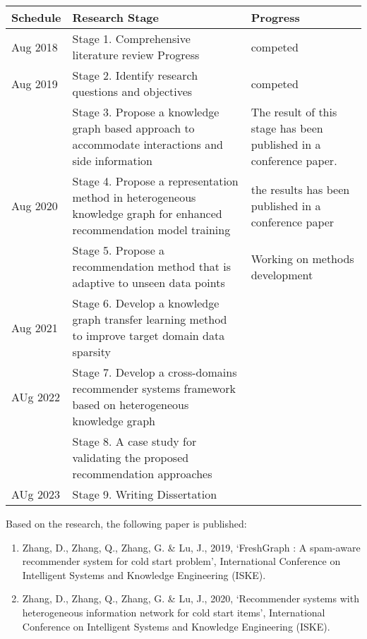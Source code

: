 \begin{table}[h!]
    \begin{tabular}{ |p{2cm}|p{6cm}|p{4cm}|}
     \hline
        Schedule & Research Stage & Progress \\
     \hline
        \rowcolor{gray}
        Aug 2018  & Stage 1. Comprehensive literature review Progress  & competed  \\
        \hline
        \rowcolor{gray}
        Aug 2019  & Stage 2. Identify research questions and objectives  & competed  \\
        \rowcolor{gray}
        & Stage 3. Propose a knowledge graph based approach to accommodate interactions and side information & The result of this stage has been published in a conference paper. \\
        \hline
        \rowcolor{lightgray}
        Aug 2020  & Stage 4. Propose a representation method in heterogeneous knowledge graph for enhanced recommendation model training & the results has been published in a conference paper  \\
        & Stage 5. Propose a recommendation method that is adaptive to unseen data points  &Working on methods development\\
        \hline
        Aug 2021  & Stage 6. Develop a knowledge graph transfer learning method to improve target domain data sparsity & \\
        \hline
        AUg 2022  & Stage 7. Develop a cross-domains recommender systems framework based on heterogeneous knowledge graph  & \\
        & Stage 8.  A case study for validating the proposed recommendation approaches  & \\
        \hline
        AUg 2023 & Stage 9. Writing Dissertation & \\
      \hline
     \end{tabular}
\end{table}

\bigskip
\bigskip
Based on the research, the following paper is published:
\begin{enumerate}
    \item Zhang, D., Zhang, Q., Zhang, G. \& Lu, J., 2019,  ‘FreshGraph :  A spam-aware recommender system for cold start problem’, International Conference on Intelligent Systems and Knowledge Engineering (ISKE).
    \item Zhang, D., Zhang, Q., Zhang, G. \& Lu, J., 2020, ‘Recommender systems with heterogeneous information network for cold start items’, International Conference on Intelligent Systems and Knowledge Engineering (ISKE).
\end{enumerate}
 
